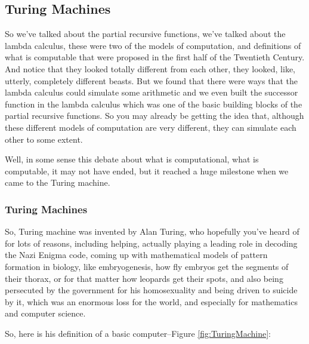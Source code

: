 \documentclass[]{article}
\begin{document}
\subsection{Turing Machines}

So we've talked about the
partial recursive functions,
we've talked about
the lambda calculus,
these were two of
the models of computation,
and definitions of
what is computable
that were proposed
in the first half
of the Twentieth Century.
And notice that they looked
totally different from each other,
they looked, like,
utterly, completely
different beasts.
But we found that there were ways
that the lambda calculus
could simulate
some arithmetic
and we even built the successor function
in the lambda calculus
which was one of
the basic building blocks
of the partial recursive functions.
So you may already
be getting the idea
that, although these different models
of computation are very different,
they can simulate each other
to some extent.

Well, in some sense
this debate about
what is computational,
what is computable,
it may not have ended,
but it reached a huge milestone
when we came to
the Turing machine.

\subsubsection{Turing Machines}

So, Turing machine was invented
by Alan Turing, who hopefully
you've heard of for lots of reasons,
including helping,
actually playing a leading role
in decoding the Nazi Enigma code,
coming up with mathematical models
of pattern formation in biology,
like embryogenesis, how
fly embryos get the segments
of their thorax,
or for that matter
how leopards get their spots,
and also being persecuted
by the government
for his homosexuality
and being driven to suicide by it,
which was an enormous loss
for the world, and especially for mathematics and computer science.

So, here is his definition of a basic computer--Figure \ref{fig:TuringMachine}:
\end{document}
